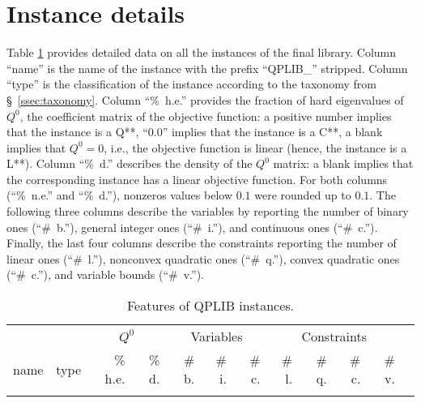 
\section{Instance details}\label{sec:instance_details}


Table \ref{tab:A1} provides detailed data on all the instances of the final library.
Column ``name'' is the name of the instance with the prefix ``QPLIB\_'' stripped.
Column ``type'' is the classification of the instance according to the taxonomy from \S~\ref{ssec:taxonomy}.
Column ``\%~h.e.'' provides the fraction of hard eigenvalues of $Q^0$, the coefficient matrix of the objective function: a positive number implies that the instance is a Q**, ``0.0'' implies that the instance is a C**, a blank implies that $Q^0 = 0$, i.e., the objective function is linear (hence, the instance is a L**).
Column ``\%~d.'' describes the density of the $Q^0$ matrix: a blank implies that the corresponding instance has a linear objective function.
For both columns (``\%~n.e.'' and ``\%~d.''), nonzeros values below $0.1$ were rounded up to $0.1$.
The following three columns describe the variables by reporting the number of binary ones (``\#~b.''), general integer ones (``\#~i.''), and continuous ones (``\#~c.''). Finally, the last four columns describe the constraints reporting the number of linear ones (``\#~l.''), nonconvex quadratic ones (``\#~q.''), convex quadratic ones (``\#~c.''), and variable bounds (``\#~v.''). 



{\tiny
\begin{longtable}{llrrrrrrrrrr}
\toprule

& & \multicolumn{2}{c}{$Q^0$} & \multicolumn{3}{c}{Variables} & \multicolumn{4}{c}{Constraints} \\
\cmidrule(lr){3-4} \cmidrule(lr){5-7} \cmidrule(lr){8-11}
name & type & \% h.e. & \% d. & \# b. & \# i. & \# c. & \# l. & \# q. & \# c. & \# v. \\
\midrule
\endhead 														



\bottomrule

\caption{Features of QPLIB instances.}
\label{tab:A1}

\end{longtable}

}




